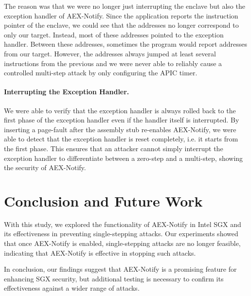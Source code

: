 \documentclass{llncs}
\begin{document}
The reason was that we were no longer just interrupting the enclave but also the exception handler of AEX-Notify.
Since the application reports the instruction pointer of the enclave,
we could see that the addresses no longer correspond to only our target.
Instead, most of these addresses pointed to the exception handler.
Between these addresses, sometimes the program would report addresses from our target.
However, the addresses always jumped at least several instructions from the previous
and we were never able to reliably cause a controlled multi-step attack
by only configuring the APIC timer.


\paragraph{Interrupting the Exception Handler.}
We were able to verify that the exception handler is always rolled back to the first phase of the exception handler
even if the handler itself is interrupted.
By inserting a page-fault after the assembly stub re-enables AEX-Notify,
we were able to detect that the exception handler is reset completely,
i.e. it starts from the first phase.
This ensures that an attacker cannot simply interrupt the exception handler
to differentiate between a zero-step and a multi-step,
showing the security of AEX-Notify.

\section{Conclusion and Future Work}

With this study, we explored the functionality of AEX-Notify in Intel SGX and
its effectiveness in preventing single-stepping attacks.
Our experiments showed that once AEX-Notify is enabled,
single-stepping attacks are no longer feasible,
indicating that AEX-Notify is effective in stopping such attacks.

In conclusion, our findings suggest that AEX-Notify is a promising feature for enhancing SGX security,
but additional testing is necessary to confirm its effectiveness against a wider range of attacks.


%

\end{document}
